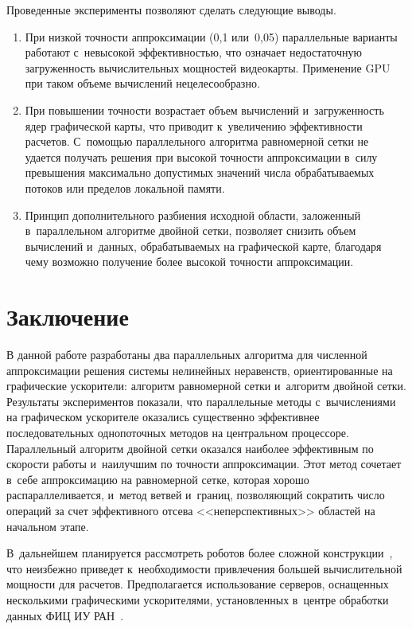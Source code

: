 \begin{multicols}{2}
Проведенные эксперименты позволяют сделать следующие выводы.
\begin{enumerate}[1.]
\item При низкой точности аппроксимации (0,1 или~0,05) параллельные 
варианты работают с~невысокой эффективностью, что означает 
недостаточную загруженность вычислительных мощностей видеокарты. 
Применение GPU при таком объеме вычислений нецелесообразно.
\item При повышении точности возрастает объем вычислений 
и~загруженность ядер графической карты, что приводит к~увеличению 
эффективности расчетов. С~по\-мощью параллельного алгоритма 
равномерной сетки не удается получать решения при высокой точ\-ности 
аппроксимации в~силу превышения максимально допустимых значений 
числа обрабатываемых потоков или пределов локальной памяти. 
\item Принцип дополнительного разбиения исходной области, заложенный 
в~параллельном алгоритме двойной сетки, позволяет снизить объем 
вычислений и~данных, обрабатываемых на графической карте, благодаря 
чему возможно получение более высокой точности аппроксимации.
\end{enumerate}

\section{Заключение}
     
     В данной работе разработаны два параллельных алгоритма для численной 
аппроксимации решения системы нелинейных неравенств, ориентированные на 
графические ускорители: алгоритм равномерной сетки и~алгоритм двойной 
сетки. Результаты экспериментов показали, что параллельные методы 
с~вычислениями на графическом ускорителе оказались существенно 
эффективнее последовательных однопоточных методов на центральном 
процессоре. Параллельный алгоритм двойной сетки оказался наиболее 
эффективным по скорости работы и~наилучшим по точности аппроксимации. 
Этот метод сочетает в~себе аппроксимацию на равномерной сетке, которая 
хорошо распараллеливается, и~метод ветвей и~границ, позволяющий сократить 
число операций за счет эффективного отсева <<неперспективных>> областей 
на начальном этапе.
     
     В~дальнейшем планируется рассмотреть роботов более сложной 
конструкции~\cite{6-pos}, что неизбежно приведет к~необходимости 
привлечения большей вычислительной мощности для расчетов. Предполагается 
использование серверов, оснащенных несколькими графическими 
ускорителями, установленных в~центре обработки данных ФИЦ ИУ 
РАН~\cite{7-pos}.



\end{multicols}
